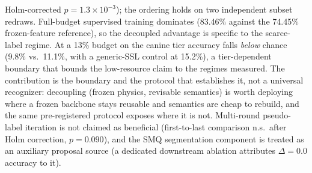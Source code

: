 Holm-corrected $p{=}1.3\times10^{-3}$); the ordering holds on two independent subset redraws. Full-budget supervised training dominates (83.46\% against the 74.45\% frozen-feature reference), so the decoupled advantage is specific to the scarce-label regime. At a 13\% budget on the canine tier accuracy falls \emph{below} chance (9.8\% vs.\ 11.1\%, with a generic-SSL control at 15.2\%), a tier-dependent boundary that bounds the low-resource claim to the regimes measured. The contribution is the boundary and the protocol that establishes it, not a universal recognizer: decoupling (frozen physics, revisable semantics) is worth deploying where a frozen backbone stays reusable and semantics are cheap to rebuild, and the same pre-registered protocol exposes where it is not. Multi-round pseudo-label iteration is not claimed as beneficial (first-to-last comparison n.s.\ after Holm correction, $p=0.090$), and the SMQ segmentation component is treated as an auxiliary proposal source (a dedicated downstream ablation attributes $\Delta = 0.0$ accuracy to it).

